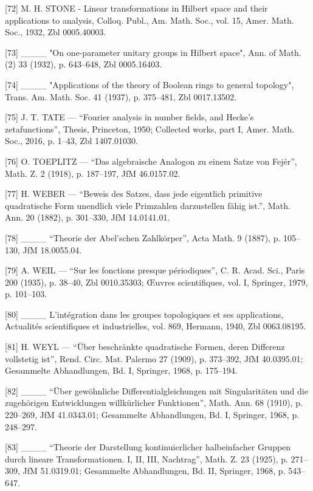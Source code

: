 {[}72{]} M. H. STONE - Linear transformations in Hilbert space and their applications to analysis, Colloq. Publ., Am. Math. Soc., vol. 15, Amer. Math. Soc., 1932, Zbl 0005.40003.

{[}73{]} \_\_\_\_ "On one-parameter unitary groups in Hilbert space", Ann. of Math. (2) 33 (1932), p. 643--648, Zbl 0005.16403.

{[}74{]} \_\_\_\_ "Applications of the theory of Boolean rings to general topology", Trans. Am. Math. Soc. 41 (1937), p. 375--481, Zbl 0017.13502.

{[}75{]} J. T. TATE — “Fourier analysis in number fields, and Hecke's zetafunctions”, Thesis, Princeton, 1950; Collected works, part I, Amer. Math. Soc., 2016, p. 1–43, Zbl 1407.01030.

{[}76{]} O. TOEPLITZ — “Das algebraische Analogon zu einem Satze von Fejér”, Math. Z. 2 (1918), p. 187–197, JfM 46.0157.02.

{[}77{]} H. WEBER — “Beweis des Satzes, dass jede eigentlich primitive quadratische Form unendlich viele Primzahlen darzustellen fähig ist.”, Math. Ann. 20 (1882), p. 301–330, JfM 14.0141.01.

{[}78{]} \_\_\_\_ “Theorie der Abel'schen Zahlkörper”, Acta Math. 9 (1887), p. 105–130, JfM 18.0055.04.

{[}79{]} A. WEIL — “Sur les fonctions presque périodiques”, C. R. Acad. Sci., Paris 200 (1935), p. 38–40, Zbl 0010.35303; Œuvres scientifiques, vol. I, Springer, 1979, p. 101–103.

{[}80{]} \_\_\_\_ L'intégration dans les groupes topologiques et ses applications, Actualités scientifiques et industrielles, vol. 869, Hermann, 1940, Zbl 0063.08195.

{[}81{]} H. WEYL — “Über beschränkte quadratische Formen, deren Differenz vollstetig ist”, Rend. Circ. Mat. Palermo 27 (1909), p. 373–392, JfM 40.0395.01; Gesammelte Abhandlungen, Bd. I, Springer, 1968, p. 175–194.

{[}82{]} \_\_\_\_ “Über gewöhnliche Differentialgleichungen mit Singularitäten und die zugehörigen Entwicklungen willkürlicher Funktionen”, Math. Ann. 68 (1910), p. 220–269, JfM 41.0343.01; Gesammelte Abhandlungen, Bd. I, Springer, 1968, p. 248–297.

{[}83{]} \_\_\_\_ “Theorie der Darstellung kontinuierlicher halbeinfacher Gruppen durch lineare Transformationen. I, II, III, Nachtrag”, Math. Z. 23 (1925), p. 271–309, JfM 51.0319.01; Gesammelte Abhandlungen, Bd. II, Springer, 1968, p. 543–647.

